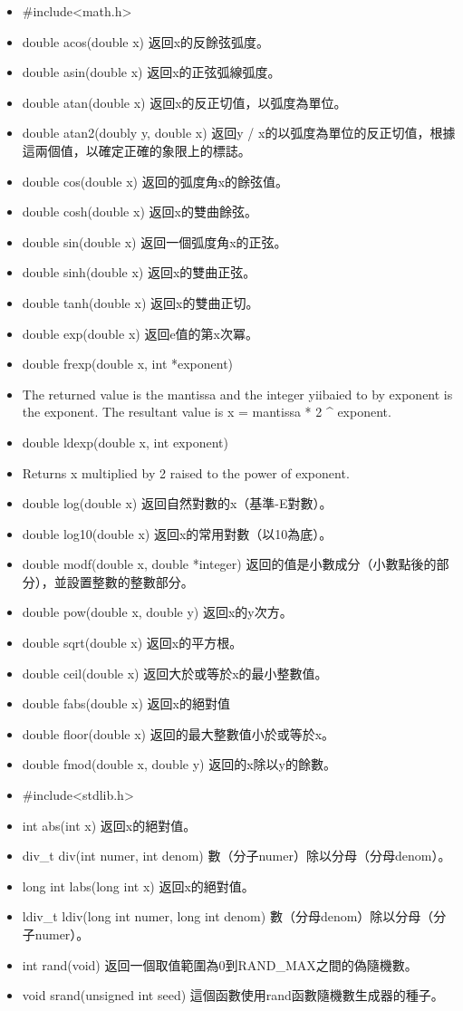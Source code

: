 \begin{itemize}
\item #include<math.h>

\item double acos(double x) 返回x的反餘弦弧度。
\item double asin(double x) 返回x的正弦弧線弧度。
\item double atan(double x) 返回x的反正切值，以弧度為單位。
\item double atan2(doubly y, double x) 返回y / x的以弧度為單位的反正切值，根據這兩個值，以確定正確的象限上的標誌。
\item double cos(double x) 返回的弧度角x的餘弦值。
\item double cosh(double x) 返回x的雙曲餘弦。
\item double sin(double x) 返回一個弧度角x的正弦。
\item double sinh(double x) 返回x的雙曲正弦。
\item double tanh(double x) 返回x的雙曲正切。
\item double exp(double x) 返回e值的第x次冪。
\item double frexp(double x, int *exponent)
\item The returned value is the mantissa and the integer yiibaied to by exponent is the exponent. The resultant value is x = mantissa * 2 ^ exponent.
\item double ldexp(double x, int exponent)
\item Returns x multiplied by 2 raised to the power of exponent.
\item double log(double x) 返回自然對數的x（基準-E對數）。
\item double log10(double x) 返回x的常用對數（以10為底）。
\item double modf(double x, double *integer) 返回的值是小數成分（小數點後的部分），並設置整數的整數部分。
\item double pow(double x, double y) 返回x的y次方。
\item double sqrt(double x) 返回x的平方根。
\item double ceil(double x) 返回大於或等於x的最小整數值。
\item double fabs(double x) 返回x的絕對值
\item double floor(double x) 返回的最大整數值小於或等於x。
\item double fmod(double x, double y) 返回的x除以y的餘數。

\item #include<stdlib.h>

\item int abs(int x) 返回x的絕對值。
\item div_t div(int numer, int denom) 數（分子numer）除以分母（分母denom）。
\item long int labs(long int x) 返回x的絕對值。
\item ldiv_t ldiv(long int numer, long int denom) 數（分母denom）除以分母（分子numer）。
\item int rand(void) 返回一個取值範圍為0到RAND_MAX之間的偽隨機數。
\item void srand(unsigned int seed) 這個函數使用rand函數隨機數生成器的種子。
\end{itemize}